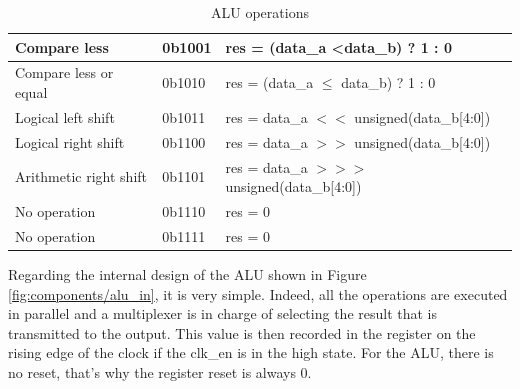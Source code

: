 \begin{table}[ht]
\begin{tabular}{|l|l|l|}
    Compare less                                                     & 0b1001                                                      & res = (data\_a \textless data\_b) ? 1 : 0                      \\ \hline
    Compare less or equal                                            & 0b1010                                                      & res = (data\_a $\leq$ data\_b) ? 1 : 0                   \\ \hline
    Logical left shift                                               & 0b1011                                                      & res = data\_a $<<$ unsigned(data\_b[4:0])                     \\ \hline
    Logical right shift                                              & 0b1100                                                      & res = data\_a $>>$ unsigned(data\_b[4:0])               \\ \hline
    Arithmetic right shift                                           & 0b1101                                                      & res = data\_a $>>>$ unsigned(data\_b[4:0]) \\ \hline
    No operation                                                     & 0b1110                                                      & res = 0                                                        \\ \hline
    No operation                                                     & 0b1111                                                      & res = 0                                                        \\ \hline
    \end{tabular}
    \caption{ALU operations}
    \label{tab:alu/alufn}
\end{table}

Regarding the internal design of the ALU shown in Figure \ref{fig:components/alu_in}, it is very 
simple. Indeed, all the operations are executed in parallel and a multiplexer is in charge of 
selecting the result that is transmitted to the output. This value is then recorded in the 
register on the rising edge of the clock if the clk\_en is in the high state. For the ALU, there is 
no reset, that's why the register reset is always 0.

